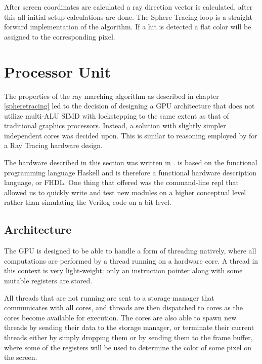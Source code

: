 			After screen coordinates are calculated a ray direction vector is
			calculated, after this all initial setup calculations are done. The
			Sphere Tracing loop is a straight-forward implementation of the 
			algorithm. If a hit is detected a flat color will be assigned to 
			the corresponding pixel.

	\section{Processor Unit} \label{implproc}

		The properties of the ray marching algorithm as described in chapter
		\ref{spheretracing} led to the decision of designing a GPU architecture
		that does not utilize multi-ALU SIMD with lockstepping to the same
		extent as that of traditional graphics processors. Instead, a solution 
		with slightly simpler independent cores was decided upon. This is 
		similar to reasoning employed by \cite{Woop2005} for a Ray Tracing 
		hardware design.

		The hardware described in this section was written in \clash. \clash is
		based on the functional programming language Haskell and is therefore a
		functional hardware description language, or FHDL. One thing that
		\clash offered was the command-line repl that allowed us to quickly
		write and test new modules on a higher conceptual level rather than
		simulating the Verilog code on a bit level.

		\subsection{Architecture}

			The GPU is designed to be able to handle a form of threading
			natively, where all computations are performed by a thread running
			on a hardware core. A thread in this context is very light-weight:
			only an instruction pointer along with some mutable registers are
			stored.

			All threads that are not running are sent to a storage manager that
			communicates with all cores, and threads are then dispatched to
			cores as the cores become available for execution. The cores are
			also able to spawn new threads by sending their data to the storage
			manager, or terminate their current threads either by simply
			dropping them or by sending them to the frame buffer, where some of
			the registers will be used to determine the color of some pixel on
			the screen.

